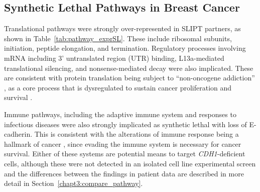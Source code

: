 
\subsection{Synthetic Lethal Pathways in Breast Cancer} \label{chapt3:exprSL_pathways}

Translational \glspl{pathway} were strongly over-represented in \gls{SLIPT} partners, as shown in Table~\ref{tab:pathway_exprSL}. These include ribosomal subunits, initiation, peptide elongation, and termination. Regulatory processes involving \acrshort{mRNA} including 3' untranslated region (UTR) binding, L13a-mediated translational silencing, and nonsense-mediated decay were also implicated. These are consistent with protein translation being subject to ``\gls{non-oncogene addiction}'' \citep{Luo2009}, as a core process that is dysregulated to sustain cancer proliferation and survival \citep{Gao2015}.

Immune \glspl{pathway}, including the adaptive immune system and responses to infectious diseases were also strongly implicated as \gls{synthetic lethal} with loss of \gls{E-cadherin}. This is consistent with the alterations of immune response being a hallmark of cancer \cite{Hanahan2000}, since evading the immune system is necessary for cancer survival. Either of these systems are potential means to target \textit{CDH1}-deficient cells, although these were not detected in an isolated cell line experimental screen \citep{Telford2015} and the differences between the findings in patient data are described in more detail in Section~\ref{chapt3:compare_pathway}.

